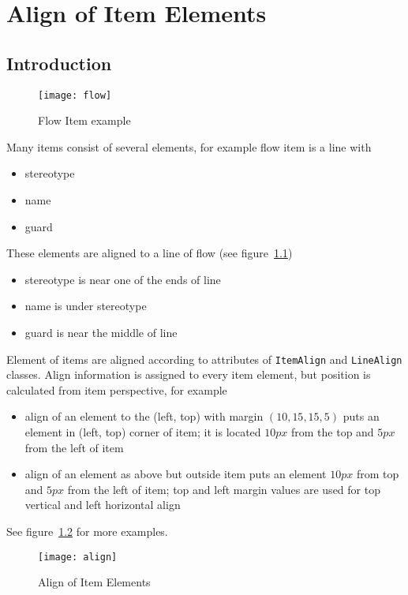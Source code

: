 \documentclass{book}
\newcommand{\rclass}[1]{\texttt{#1}}
\begin{document}
\chapter{Align of Item Elements}
\section{Introduction}
\begin{figure}
\begin{center}
\texttt{[image: flow]}
\end{center}
\caption{Flow Item example}\label{items:example:flow}
\end{figure}

Many items consist of several elements, for example flow item is a line
with
\begin{itemize}
\item stereotype
\item name
\item guard
\end{itemize}
These elements are aligned to a line of flow (see
figure~\ref{items:example:flow})
\begin{itemize}
\item stereotype is near one of the ends of line
\item name is under stereotype
\item guard is near the middle of line
\end{itemize}

Element of items are aligned according to attributes of
\rclass{ItemAlign} and \rclass{LineAlign} classes. Align information is
assigned to every item element, but position is calculated from item
perspective, for example
\begin{itemize}
\item align of an element to the (left, top) with margin $(10, 15, 15, 5)$
puts an element in (left, top) corner of item; it is located $10px$ from the top
and $5px$ from the left of item
\item align of an element as above but outside item puts an element $10px$
from top and $5px$ from the left of item; top and left margin values are
used for top vertical and left horizontal align
\end{itemize}
See figure~\ref{items:align} for more examples.

\begin{figure}
\begin{center}
\texttt{[image: align]}
\end{center}
\caption{Align of Item Elements}\label{items:align}
\end{figure}
\end{document}
